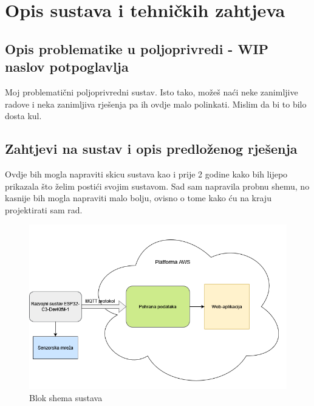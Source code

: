 \chapter{Opis sustava i tehničkih zahtjeva}

\section{Opis problematike u poljoprivredi - WIP naslov potpoglavlja}

Moj problematični poljoprivredni sustav. Isto tako, možeš naći neke zanimljive radove i neka zanimljiva rješenja pa ih ovdje malo polinkati. Mislim da bi to bilo dosta kul.

\section{Zahtjevi na sustav i opis predloženog rješenja}

Ovdje bih mogla napraviti skicu sustava kao i prije 2 godine kako bih lijepo prikazala što želim postići svojim sustavom. Sad sam napravila probnu shemu, no kasnije bih mogla napraviti malo bolju, ovisno o tome kako ću na kraju projektirati sam rad.

\begin{figure}[ht]
	\includegraphics[width=\linewidth]{imgs/shema}
	\caption{Blok shema sustava}
	\label{fig:shema}
\end{figure}

